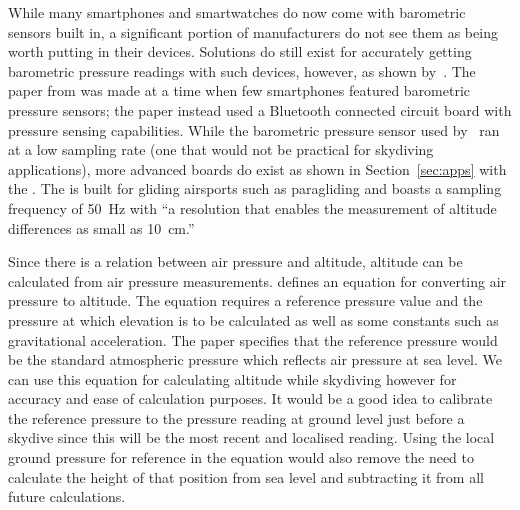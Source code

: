 \documentclass[11pt, a4paper, twocolumn]{article}
\begin{document}
While many smartphones and smartwatches do now come with barometric sensors built in, a significant portion of manufacturers do not see them as being worth putting in their devices. Solutions do still exist for accurately getting barometric pressure readings with such devices, however, as shown by~\textcite{he_atmospheric_2012}. The paper from \citeyear{he_atmospheric_2012} was made at a time when few smartphones featured barometric pressure sensors; the paper instead used a Bluetooth connected circuit board with pressure sensing capabilities. While the barometric pressure sensor used by~\textcite{he_atmospheric_2012} ran at a low sampling rate (one that would not be practical for skydiving applications), more advanced boards do exist as shown in Section~\ref{sec:apps} with the .
The  is built for gliding airsports such as paragliding and boasts a sampling frequency of \SI{50}{\Hz} with ``a resolution that enables the measurement of altitude differences as small as \SI{10}{\cm}.''

Since there is a relation between air pressure and altitude, altitude can be calculated from air pressure measurements. \textcite{liu_beyond_2014} defines an equation for converting air pressure to altitude. The equation requires a reference pressure value and the pressure at which elevation is to be calculated as well as some constants such as gravitational acceleration. The paper specifies that the reference pressure would be the standard atmospheric pressure which reflects air pressure at sea level. We can use this equation for calculating altitude while skydiving however for accuracy and ease of calculation purposes. It would be a good idea to calibrate the reference pressure to the pressure reading at ground level just before a skydive since this will be the most recent and localised reading. Using the local ground pressure for reference in the equation would also remove the need to calculate the height of that position from sea level and subtracting it from all future calculations.
\end{document}

